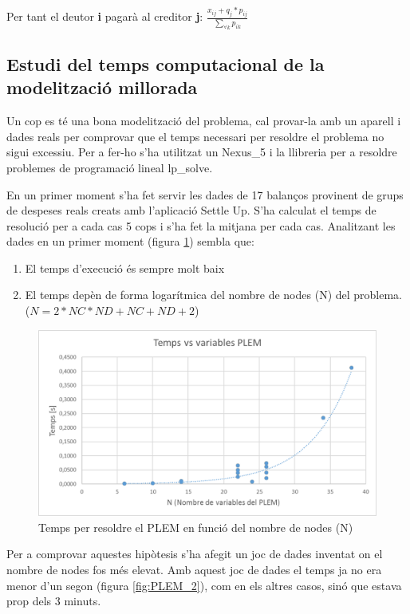 Per tant el deutor \textbf{i} pagarà al creditor \textbf{j}: $\frac{x_{ij} + q_{j}*p_{ij}}{\sum\limits_{\forall k} p_{ik}}$

\subsection{Estudi del temps computacional de la modelització millorada}
Un cop es té una bona modelització del problema, cal provar-la amb un aparell i dades reals per comprovar que el temps necessari per resoldre el problema no sigui excessiu. Per a fer-ho s'ha utilitzat un \gls{Nexus_5} i la llibreria per a resoldre problemes de programació lineal \gls{lp_solve}.

En un primer moment s'ha fet servir les dades de 17 balanços provinent de grups de despeses reals creats amb l'aplicació Settle Up. S'ha calculat el temps de resolució per a cada cas 5 cops i s'ha fet la mitjana per cada cas. Analitzant les dades en un primer moment (figura \ref{fig:PLEM_1}) sembla que:

\begin{enumerate}
\item El temps d'execució és sempre molt baix
\item El temps depèn de forma logarítmica del nombre de nodes (N) del problema. ($N = 2*NC*ND + NC + ND + 2$)
\end{enumerate}

\begin{figure}[ht]
\centering
\includegraphics[scale=0.8]{PLEM_temps_2.png}
\caption{Temps per resoldre el PLEM en funció del nombre de nodes (N)}\label{fig:PLEM_1}
\end{figure}

Per a comprovar aquestes hipòtesis s'ha afegit un joc de dades inventat on el nombre de nodes fos més elevat. Amb aquest joc de dades el temps ja no era menor d'un segon (figura \ref{fig:PLEM_2}), com en els altres casos, sinó que estava prop dels 3 minuts. 

